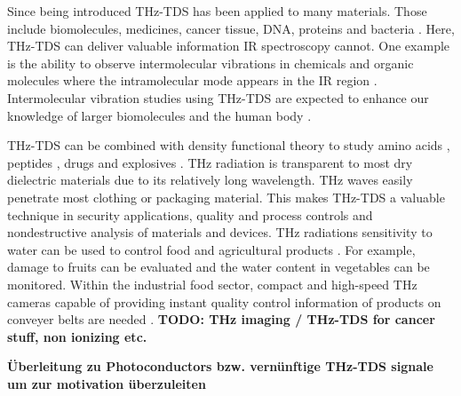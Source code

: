 Since being introduced THz-TDS has been applied to many materials. Those include biomolecules, medicines, cancer tissue, DNA, proteins and bacteria \cite{chenLargeOxidationDependence2005,waltherNoncovalentIntermolecularForces2003,fischerTerahertzTimedomainSpectroscopy2005}. Here, THz-TDS can deliver valuable information IR spectroscopy cannot. One example is the ability to observe intermolecular vibrations in chemicals and organic molecules where the intramolecular mode appears in the IR region \cite{nagaiDirectEvidenceIntermolecular2005}. Intermolecular vibration studies using THz-TDS are expected to enhance our knowledge of larger biomolecules and the human body \cite{tonouchiCuttingedgeTerahertzTechnology2007}. 

THz-TDS can be combined with density functional theory \cite{chenCombinationTerahertzSpectroscopy2022} to study amino acids \cite{liaoAminoacidClassificationBased2023}, peptides \cite{neuTerahertzSpectroscopyTetrameric2019}, drugs \cite{kawaseNondestructiveTerahertzImaging2003} and explosives \cite{daviesTerahertzSpectroscopyExplosives2008}. THz radiation is transparent to most dry dielectric materials due to its relatively long wavelength. THz waves easily penetrate most clothing \cite{prokschaTerahertzInsightsFabric2024} or packaging \cite{wietzkeTerahertzSpectroscopyPolymers2011} material. This makes THz-TDS a valuable technique in security applications, quality and process controls and nondestructive analysis of materials and devices. THz radiations sensitivity to water can be used to control food and agricultural products \cite{afsah-hejriTerahertzSpectroscopyImaging2020}. For example, damage to fruits can be evaluated and the water content in vegetables can be monitored. Within the industrial food sector, compact and high-speed THz cameras capable of providing instant quality control information of products on conveyer belts are needed \cite{THzSecurityApplications}. \textbf{TODO: THz imaging / THz-TDS for cancer stuff, non ionizing etc.}

\textbf{Überleitung zu Photoconductors bzw. vernünftige THz-TDS signale um zur motivation überzuleiten}







